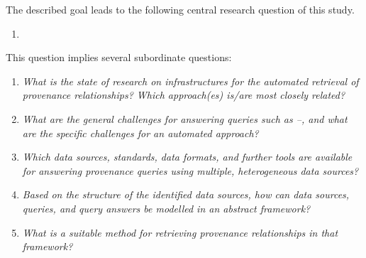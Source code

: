 The described goal leads to the following
central research question of this study.
%
\begin{mdframed}[
  linewidth=1pt,
  linecolor=black!50,
  innerleftmargin=0pt,innerrightmargin=0pt,
  leftline=false,rightline=false
]
  \begin{enumerate}
    \item[\RQ\phantom{\mybold{1}}]
  \end{enumerate}
\end{mdframed}
%
This question implies several subordinate questions:
%
\begin{mdframed}[
  linewidth=1pt,
  linecolor=black!50,
  innerleftmargin=0pt,innerrightmargin=0pt,
  leftline=false,rightline=false
]
  \begin{enumerate}
    \item[\subquestion{1}]
      \emph{What is the state of research on infrastructures for the automated retrieval
      of provenance relationships? Which approach(es) is/are most closely related?}
    \item[\subquestion{2}]
      \emph{What are the general challenges for answering queries such as --,
      and what are the specific challenges for an automated approach?}
    \item[\subquestion{3}]
      \emph{Which data sources, standards, data formats, and further tools
      are available for answering provenance queries using multiple, heterogeneous data sources?}
    \item[\subquestion{4}]
      \emph{Based on the structure of the identified data sources,
      how can data sources, queries, and query answers be modelled in an abstract framework?}
    \item[\subquestion{5}]
      \emph{What is a suitable method for retrieving provenance relationships
      in that framework?}
  \end{enumerate}
\end{mdframed}


